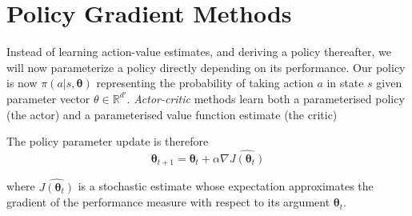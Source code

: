 \section{Policy Gradient Methods}
Instead of learning action-value estimates, and deriving a policy thereafter, we will now parameterize a policy directly depending on its performance. Our policy is now $\pi(a|s, \boldsymbol{\theta})$ representing the probability of taking action $a$ in state $s$ given parameter vector $\theta \in \mathbb{R}^{d'}$. \textit{Actor-critic} methods learn both a parameterised policy (the actor) and a parameterised value function estimate (the critic)

The policy parameter update is therefore
\begin{equation}
\boldsymbol{\theta}_{t+1} = \boldsymbol{\theta}_{t} + \alpha \nabla \hat{J(\boldsymbol{\theta}_{t})} 
\end{equation}

where $\hat{J(\boldsymbol{\theta}_{t})}$ is a stochastic estimate whose expectation approximates the gradient of the performance measure with respect to its argument $\boldsymbol{\theta}_{t}$.

